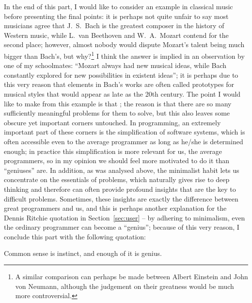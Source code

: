 In the end of this part, I would like to consider an example in classical
music before presenting the final points: it is perhaps not quite unfair
to say most musicians agree that J.~S.\ Bach is the greatest composer in
the history of Western music, while L.\ van Beethoven and W.~A.\ Mozart
contend for the second place; however, almost nobody would dispute Mozart's
talent being much bigger than Bach's, but why?\footnote{A similar comparison
can perhaps be made between Albert Einstein and John von Neumann, although the
judgement on their greatness would be much more controversial.}  I think the
answer is implied in an observation by one of my schoolmates: ``Mozart always
had new musical ideas, while Bach constantly explored for new possibilities in
existent ideas''; it is perhaps due to this very reason that elements in Bach's
works are often called prototypes for musical styles that would appear as late
as the 20th century.  The point I would like to make from this example is
that ; the reason is that
there are so many sufficiently meaningful problems for them to solve, but this
also leaves some obscure yet important corners untouched.  In programming, an
extremely important part of these corners is the simplification of software
systems, which is often accessible even to the average programmer as long as
he/she is determined enough; in practice this simplification is more relevant
for us, the average programmers, so in my opinion we should feel more
motivated to do it than ``geniuses'' are.  In addition, as was analysed
above, the minimalist habit lets us concentrate on the essentials of problems,
which naturally gives rise to deep thinking and therefore can often provide
profound insights that are the key to difficult problems.  Sometimes, these
insights are exactly the difference between great programmers and us, and
this is perhaps another explanation for the Dennis Ritchie quotation
in Section~\ref{sec:user} -- by adhering to minimalism, even the
ordinary programmer can become a ``genius''; because of this very
reason, I conclude this part with the following quotation:
\begin{quoting}
	Common sense is instinct, and enough of it is genius.
\end{quoting}

